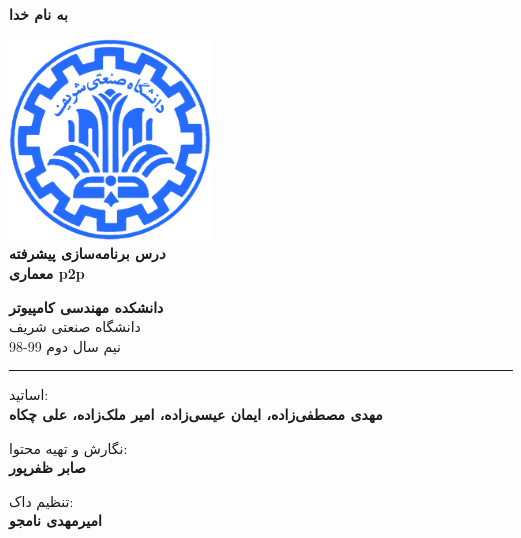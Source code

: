\documentclass[]{article}
\begin{document}
\begin{titlepage}
\begin{center}

\textbf{ \Huge{به نام خدا} }
        
\vspace{0.2cm}

\includegraphics[width=0.4\textwidth]{sharif1.png}\\
\vspace{0.2cm}
\textbf{ \Huge{\emph درس برنامه‌سازی پیشرفته} }\\
\vspace{0.25cm}
\textbf{ \Large{معماری p2p} }
\vspace{0.2cm}
       
 
      \large \textbf{دانشکده مهندسی کامپیوتر}\\\vspace{0.1cm}
    \large   دانشگاه صنعتی شریف\\\vspace{0.2cm}
       \large   ﻧﯿﻢ سال دوم 99-98 \\\vspace{0.10cm}
      \noindent\rule[1ex]{\linewidth}{1pt}
اساتید:\\
    \textbf{{مهدی مصطفی‌زاده، ایمان عیسی‌زاده، امیر ملک‌زاده، علی چکاه}}



        \vspace{0.10cm}
نگارش و تهیه محتوا:\\
    \textbf{{صابر ظفرپور}}
    
       \vspace{0.10cm}
       تنظیم داک:\\
    \textbf{{امیرمهدی نامجو}}

    
        \vspace{0.05cm}
    

\end{center}
\end{titlepage}
\end{document}
